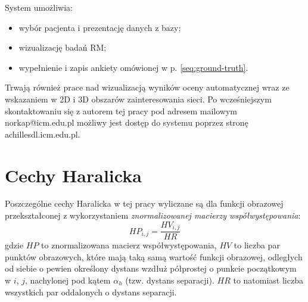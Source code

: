 System umożliwia:
\begin{itemize}[noitemsep,nolistsep]
	\item wybór pacjenta i prezentację danych z bazy;
	\item wizualizację badań RM;
	\item wypełnienie i zapis ankiety omówionej w p. \ref{seq:ground-truth}.
\end{itemize}

Trwają również prace nad wizualizacją wyników oceny automatycznej wraz \linebreak ze wskazaniem w 2D i 3D obszarów zainteresowania sieci. Po wcześniejszym skontaktowaniu się z autorem tej pracy pod adresem mailowym norkap@icm.edu.pl możliwy jest dostęp do systemu poprzez stronę achillesdl.icm.edu.pl.

\chapter{Cechy Haralicka}
\label{app:Haralick}
Poszczególne cechy Haralicka w tej pracy wyliczane są dla funkcji obrazowej przekształconej z wykorzystaniem \textit{znormalizowanej macierzy współwystępowania}: 
\begin{equation}
HP_{i,j} = \frac{HV_{i,j}}{HR}
\end{equation}
gdzie $HP$ to znormalizowana macierz współwystępowania, $HV$ to liczba par punktów obrazowych, które mają taką samą wartość funkcji obrazowej, odległych od siebie o pewien określony dystans wzdłuż półprostej o punkcie początkowym w $i$, $j$, nachylonej pod kątem $\alpha_h$ (tzw. dystans separacji). $HR$ to natomiast liczba wszystkich par oddalonych o dystans separacji. 

